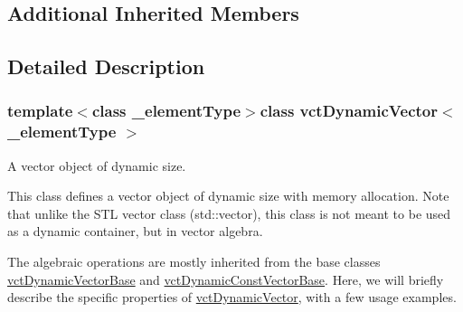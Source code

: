 \subsection*{Additional Inherited Members}


\subsection{Detailed Description}
\subsubsection*{template$<$class \-\_\-element\-Type$>$class vct\-Dynamic\-Vector$<$ \-\_\-element\-Type $>$}

A vector object of dynamic size. 

This class defines a vector object of dynamic size with memory allocation. Note that unlike the S\-T\-L vector class (std\-::vector), this class is not meant to be used as a dynamic container, but in vector algebra.

The algebraic operations are mostly inherited from the base classes \hyperlink{classvct_dynamic_vector_base}{vct\-Dynamic\-Vector\-Base} and \hyperlink{classvct_dynamic_const_vector_base}{vct\-Dynamic\-Const\-Vector\-Base}. Here, we will briefly describe the specific properties of \hyperlink{classvct_dynamic_vector}{vct\-Dynamic\-Vector}, with a few usage examples.


